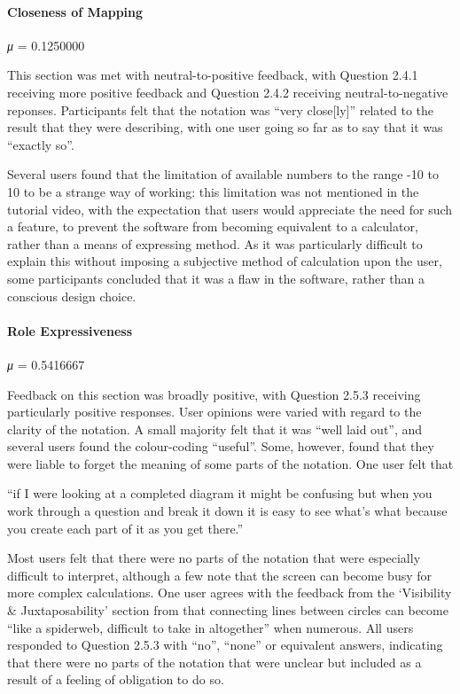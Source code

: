 \documentclass[12pt,twoside,notitlepage,xetex]{report}
\begin{document}
\paragraph{Closeness of Mapping}\hfill

\emph{μ} = 0.1250000

This section was met with neutral-to-positive feedback, with Question 2.4.1 receiving more positive feedback and Question 2.4.2 receiving neutral-to-negative reponses.  Participants felt that the notation was ``very close[ly]'' related to the result that they were describing, with one user going so far as to say that it was ``exactly so''.

Several users found that the limitation of available numbers to the range -10 to 10 to be a strange way of working: this limitation was not mentioned in the tutorial video, with the expectation that users would appreciate the need for such a feature, to prevent the software from becoming equivalent to a calculator, rather than a means of expressing method.  As it was particularly difficult to explain this without imposing a subjective method of calculation upon the user, some participants concluded that it was a flaw in the software, rather than a conscious design choice.

\paragraph{Role Expressiveness}\hfill

\emph{μ} = 0.5416667

Feedback on this section was broadly positive, with Question 2.5.3 receiving particularly positive responses.  User opinions were varied with regard to the clarity of the notation.  A small majority felt that it was ``well laid out'', and several users found the colour-coding ``useful''.  Some, however, found that they were liable to forget the meaning of some parts of the notation.  One user felt that
\begin{center}
\parbox[c]{\textwidth-2cm}{
\small
``if I were looking at a completed diagram it might be confusing but when you work through a question and break it down it is easy to see what's what because you create each part of it as you get there.''
}
\end{center}

Most users felt that there were no parts of the notation that were especially difficult to interpret, although a few note that the screen can become busy for more complex calculations.  One user agrees with the feedback from the `Visibility \& Juxtaposability' section from that connecting lines between circles can become ``like a spiderweb, difficult to take in altogether'' when numerous.  All users responded to Question 2.5.3 with ``no'', ``none'' or equivalent answers, indicating that there were no parts of the notation that were unclear but included as a result of a feeling of obligation to do so.
\end{document}
